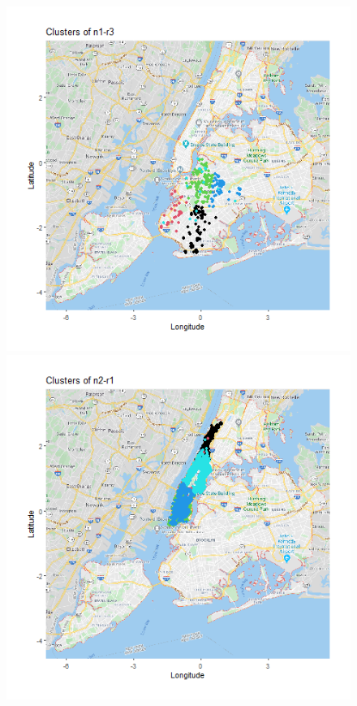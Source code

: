 \documentclass{FR16}
\begin{document}
\begin{itemize}
\begin{figure}[!htb]
\begin{minipage}{0.33\textwidth}
   \end{minipage}
   \begin{minipage}{0.33\textwidth}
     \centering
     \includegraphics[width=1\linewidth]{figures/clust-n1-r3.png} 
   \end{minipage}\hfill
   \begin{minipage}{0.33\textwidth}
     \centering
     \includegraphics[width=1\linewidth]{figures/clust-n2-r1.png}

\end{minipage}
\end{figure}
\end{itemize}
\end{document}
